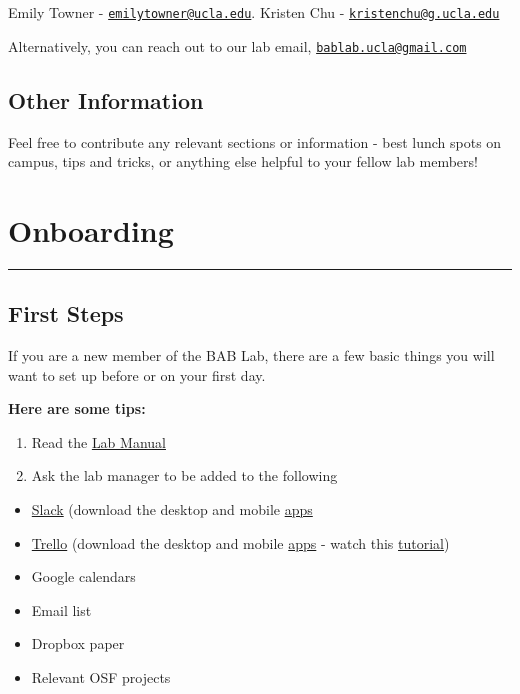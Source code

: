 \documentclass[]{book}
\providecommand{\tightlist}{%
  \setlength{\itemsep}{0pt}\setlength{\parskip}{0pt}}
\begin{document}
Emily Towner - \href{mailto:emilytowner@ucla.edu}{\nolinkurl{emilytowner@ucla.edu}}.
Kristen Chu - \href{mailto:kristenchu@g.ucla.edu}{\nolinkurl{kristenchu@g.ucla.edu}}

Alternatively, you can reach out to our lab email, \href{mailto:bablab.ucla@gmail.com}{\nolinkurl{bablab.ucla@gmail.com}}

\hypertarget{other-information}{%
\section{Other Information}\label{other-information}}

Feel free to contribute any relevant sections or information - best lunch spots on campus, tips and tricks, or anything else helpful to your fellow lab members!

\hypertarget{onboarding}{%
\chapter{Onboarding}\label{onboarding}}

\begin{center}\rule{0.5\linewidth}{\linethickness}\end{center}

\hypertarget{first-steps}{%
\section{First Steps}\label{first-steps}}

If you are a new member of the BAB Lab, there are a few basic things you will want to set up before or on your first day.

\textbf{Here are some tips:}

\begin{enumerate}
\def\labelenumi{\arabic{enumi}.}
\item
  Read the \href{https://paper.dropbox.com/doc/BAB-Lab-Manual-AhbI86OnRmh6Lu5Osk6g6bBAg-Y1PCLFS9hIQt2CsZrDDJy\#:h2=Server}{Lab Manual}
\item
  Ask the lab manager to be added to the following
\end{enumerate}

\begin{itemize}
\tightlist
\item
  \href{https://slack.com/}{Slack} (download the desktop and mobile \href{https://slack.com/downloads/mac}{apps}
\item
  \href{https://trello.com/emilyanntowner/boards}{Trello} (download the desktop and mobile \href{https://trello.com/en-US/platforms}{apps} - watch this \href{https://www.youtube.com/watch?v=_Ry-SnJygy8\&feature=youtu.be}{tutorial})
\item
  Google calendars
\item
  Email list
\item
  Dropbox paper
\item
  Relevant OSF projects
\end{itemize}
\end{document}
